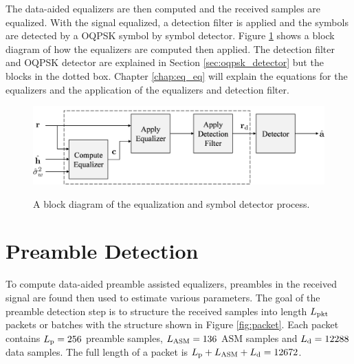 The data-aided equalizers are then computed and the received samples are equalized.
With the signal equalized, a detection filter is applied and the symbols are detected by a OQPSK symbol by symbol detector.
Figure \ref{fig:ProcessingBlock} shows a block diagram of how the equalizers are computed then applied.
The detection filter and OQPSK detector are explained in Section \ref{sec:oqpsk_detector} but the blocks in the dotted box.
Chapter \ref{chap:eq_eq} will explain the equations for the equalizers and the application of the equalizers and detection filter.
\begin{figure}
	\caption{A block diagram of the equalization and symbol detector process.}
	\centering\includegraphics[width=9.35in/100*55]{figures/systemOverview/ProcessingBlock.pdf}
	\label{fig:ProcessingBlock}
\end{figure}

\section{Preamble Detection}
\label{sec:pd}
To compute data-aided preamble assisted equalizers, preambles in the received signal are found then used to estimate various parameters.
The goal of the preamble detection step is to structure the received samples into length $L_\text{pkt}$ packets or batches with the structure shown in Figure \ref{fig:packet}.
Each packet contains $L_\text{p} = 256$ preamble samples, $L_\text{ASM} = 136$ ASM samples and $L_\text{d} = 12288$ data samples.
The full length of a packet is $L_\text{p} + L_\text{ASM} + L_\text{d} = 12672$.


